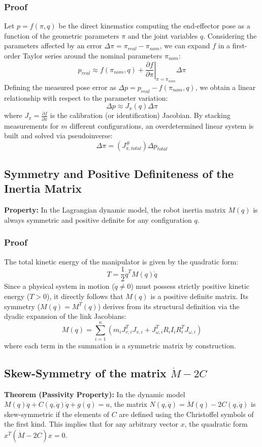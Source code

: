 \documentclass[11pt,a4paper]{article}
\begin{document}
\subsubsection{Proof}
Let $p = f(\pi, q)$ be the direct kinematics computing the end-effector pose as a function of the geometric parameters $\pi$ and the joint variables $q$. Considering the parameters affected by an error $\Delta \pi = \pi_{real} - \pi_{nom}$, we can expand $f$ in a first-order Taylor series around the nominal parameters $\pi_{nom}$:
\[
p_{real} \approx f(\pi_{nom}, q) + \left. \frac{\partial f}{\partial \pi} \right|_{\pi=\pi_{nom}} \Delta \pi
\]
Defining the measured pose error as $\Delta p = p_{real} - f(\pi_{nom}, q)$, we obtain a linear relationship with respect to the parameter variation:
\[
\Delta p \approx J_\pi(q) \Delta \pi
\]
where $J_\pi = \frac{\partial f}{\partial \pi}$ is the calibration (or identification) Jacobian. By stacking measurements for $m$ different configurations, an overdetermined linear system is built and solved via pseudoinverse:
\[
\Delta \pi = (J_{\pi, total}^\#) \Delta p_{total}
\]


\subsection{Symmetry and Positive Definiteness of the Inertia Matrix}
\textbf{Property:} In the Lagrangian dynamic model, the robot inertia matrix $M(q)$ is always symmetric and positive definite for any configuration $q$.

\subsubsection{Proof}
The total kinetic energy of the manipulator is given by the quadratic form:
\[
T = \frac{1}{2} \dot{q}^T M(q) \dot{q}
\]
Since a physical system in motion ($\dot{q} \neq 0$) must possess strictly positive kinetic energy ($T > 0$), it directly follows that $M(q)$ is a positive definite matrix. 
Its symmetry ($M(q) = M^T(q)$) derives from its structural definition via the dyadic expansion of the link Jacobians:
\[
M(q) = \sum_{i=1}^{n} \left( m_i J_{v,i}^T J_{v,i} + J_{\omega,i}^T R_i I_i R_i^T J_{\omega,i} \right)
\]
where each term in the summation is a symmetric matrix by construction.


\subsection{Skew-Symmetry of the matrix $\dot{M} - 2C$}
\textbf{Theorem (Passivity Property):} In the dynamic model $M(q)\ddot{q} + C(q,\dot{q})\dot{q} + g(q) = u$, the matrix $N(q,\dot{q}) = \dot{M}(q) - 2C(q,\dot{q})$ is skew-symmetric if the elements of $C$ are defined using the Christoffel symbols of the first kind. This implies that for any arbitrary vector $x$, the quadratic form $x^T (\dot{M} - 2C) x = 0$.
\end{document}
